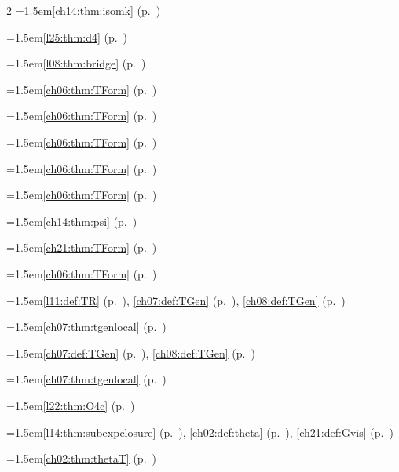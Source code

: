 \begin{multicols}{2}
\hangindent=1.5em\quad \ref{ch14:thm:isomk} (p.~\pageref{ch14:thm:isomk})\par
\hangindent=1.5em\quad \ref{l25:thm:d4} (p.~\pageref{l25:thm:d4})\par
\hangindent=1.5em\quad \ref{l08:thm:bridge} (p.~\pageref{l08:thm:bridge})\par
\hangindent=1.5em\quad \ref{ch06:thm:TForm} (p.~\pageref{ch06:thm:TForm})\par
\hangindent=1.5em\quad \ref{ch06:thm:TForm} (p.~\pageref{ch06:thm:TForm})\par
\hangindent=1.5em\quad \ref{ch06:thm:TForm} (p.~\pageref{ch06:thm:TForm})\par
\hangindent=1.5em\quad \ref{ch06:thm:TForm} (p.~\pageref{ch06:thm:TForm})\par
\hangindent=1.5em\quad \ref{ch06:thm:TForm} (p.~\pageref{ch06:thm:TForm})\par
\hangindent=1.5em\quad \ref{ch14:thm:psi} (p.~\pageref{ch14:thm:psi})\par
\hangindent=1.5em\quad \ref{ch21:thm:TForm} (p.~\pageref{ch21:thm:TForm})\par
\hangindent=1.5em\quad \ref{ch06:thm:TForm} (p.~\pageref{ch06:thm:TForm})\par
\hangindent=1.5em\quad \ref{l11:def:TR} (p.~\pageref{l11:def:TR}), \ref{ch07:def:TGen} (p.~\pageref{ch07:def:TGen}), \ref{ch08:def:TGen} (p.~\pageref{ch08:def:TGen})\par
\hangindent=1.5em\quad \ref{ch07:thm:tgenlocal} (p.~\pageref{ch07:thm:tgenlocal})\par
\hangindent=1.5em\quad \ref{ch07:def:TGen} (p.~\pageref{ch07:def:TGen}), \ref{ch08:def:TGen} (p.~\pageref{ch08:def:TGen})\par
\hangindent=1.5em\quad \ref{ch07:thm:tgenlocal} (p.~\pageref{ch07:thm:tgenlocal})\par
\hangindent=1.5em\quad \ref{l22:thm:O4c} (p.~\pageref{l22:thm:O4c})\par
\hangindent=1.5em\quad \ref{l14:thm:subexpclosure} (p.~\pageref{l14:thm:subexpclosure}), \ref{ch02:def:theta} (p.~\pageref{ch02:def:theta}), \ref{ch21:def:Gvis} (p.~\pageref{ch21:def:Gvis})\par
\hangindent=1.5em\quad \ref{ch02:thm:thetaT} (p.~\pageref{ch02:thm:thetaT})\par

\end{multicols}
